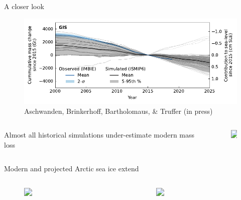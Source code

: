 \documentclass[hide notes,intlimits]{beamer}
\begin{document}
\begin{frame}{A closer look}
  \begin{figure}
    \includegraphics[width=\textwidth]{GIS_hist_with_obs}
    \caption{Aschwanden, Brinkerhoff, Bartholomaus, \& Truffer (in press)}
  \end{figure}
  \begin{columns}[c]
    \begin{column}{.5\textwidth}
      \begin{minipage}[t][.5\textheight][t]{\textwidth}
        \alert{Almost all historical simulations under-estimate modern mass loss}
      \end{minipage}
    \end{column}
    \begin{column}{.25\textwidth}
      \begin{minipage}[t][.5\textheight][t]{\textwidth}
        \begin{figure}
          \includegraphics<2>[width=1.8cm]{brain_thinking}
        \end{figure}
      \end{minipage}
    \end{column}
  \end{columns}
\end{frame}



\begin{frame}{Modern and projected Arctic sea ice extend}
  \begin{columns}[c]
    \begin{column}{.75\textwidth}
      \begin{minipage}[t][.5\textheight][c]{\textwidth}
        \begin{figure}
          \includegraphics<1>[height=6.25cm]{CCS108_Fig2_6}
        \end{figure}
      \end{minipage}
    \end{column}
    \begin{column}{.2\textwidth}
      \begin{minipage}[t][.5\textheight][c]{\textwidth}
        \begin{figure}
          \includegraphics<1>[width=1.8cm]{brain_solution}
        \end{figure}
      \end{minipage}
    \end{column}
  \end{columns}
\end{frame}
\end{document}
